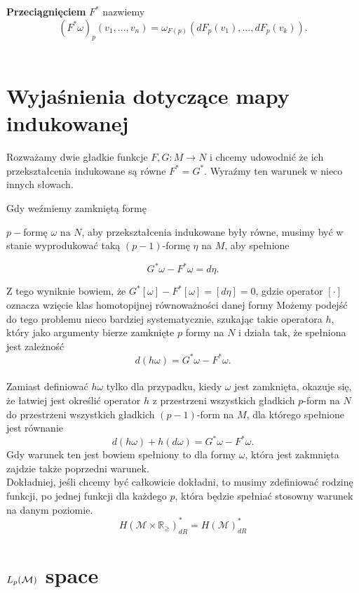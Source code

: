 \documentclass[licencjacka]{pracamgr}
\theoremstyle{definition}
\theoremstyle{definition}
\theoremstyle{plain}
\theoremstyle{plain}
\def\M{\ensuremath\mathcal{M}}
\begin{document}
\textbf{Przeciągnięciem} $F^\ast$ nazwiemy
\[
    (F^\ast \omega)_p(v_1, ..., v_n) =
        \omega_{F(p)}(dF_p(v_1), ..., dF_p(v_k)).
\] \\


\section{Wyjaśnienia dotyczące mapy indukowanej}

Rozważamy dwie gładkie funkcje $F, G: M \rightarrow N$ 
i chcemy udowodnić że ich przekształcenia indukowane są równe
$F^\ast = G^\ast$. Wyraźmy ten warunek w nieco innych słowach.

Gdy weźmiemy zamkniętą formę

$p-$formę $\omega$ na $N$, aby przekształcenia indukowane były równe,
musimy być w stanie wyprodukować taką 
 $(p-1)$-formę $\eta$ na $M$, aby spełnione

\[
    G^\ast \omega - F^\ast \omega = d\eta.
\]

Z tego wyniknie bowiem, że
$ G^\ast [\omega] - F^\ast [\omega] =
[d\eta] = 0$, gdzie operator $[\cdot]$
oznacza wzięcie klas homotopijnej równoważności danej formy
Możemy podejść do tego problemu nieco bardziej systematycznie, 
szukając takie operatora
$h$, który jako argumenty bierze zamknięte $p$ formy na $N$
i działa tak, że spełniona jest zależność
\[
    d(h\omega) = G^\ast \omega - F^\ast \omega.
\] \\

Zamiast definiować $h \omega$ tylko dla przypadku, kiedy $\omega$
jest zamknięta, okazuje się, że łatwiej jest określić operator
$h$ z przestrzeni wszystkich gładkich $p$-form na $N$
do przestrzeni wszystkich gładkich $(p-1)$-form na $M$,
dla którego spełnione jest równanie
\[
    d(h\omega) + h(d\omega) = G^\ast \omega - F^\ast \omega.
\]
Gdy warunek ten jest bowiem spełniony to dla formy $\omega$, która
jest zakmnięta zajdzie także poprzedni warunek. \\

Dokładniej, jeśli chcemy być całkowicie dokładni, to musimy
zdefiniować rodzinę funkcji, po jednej funkcji dla każdego $p$, która
będzie spełniać stosowny warunek na danym poziomie.
\[
    H(\mathcal{M} \times \mathbb{R}_{\geq})_{dR}^\ast = H(\mathcal{M})_{dR}^\ast
\]

\section{$L_p(\M)$ space}
\end{document}
